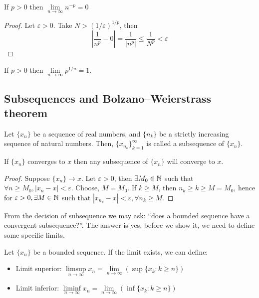 \begin{theorem}
    If $p>0$ then $\lim \limits_{n \to \infty}n^{-p} = 0$
\end{theorem}

\begin{proof}
    Let $\varepsilon > 0$. Take $N > (1/\varepsilon)^{1/p}$, then
    \begin{equation*}
        \left |
        \frac{1}{n^p} - 0
        \right | = 
        \frac{1}{|n^p|} \leq
        \frac{1}{N^p} <
        \varepsilon
    \end{equation*}
\end{proof}

\begin{theorem}
    If $p>0$ then $\lim \limits_{n \to \infty} p^{1/n}=1$.
\end{theorem}

\subsection{Subsequences and Bolzano–Weierstrass theorem}

\begin{definition}[Subsequence]
    Let $\{x_n\}$ be a sequence of real numbers, and $\{n_k\}$ be a strictly increasing sequence of natural numbers. Then, $\{x_{n_k}\}_{k=1}^\infty$ is called a subsequence of $\{x_n\}$.
\end{definition}

\begin{theorem}
    If $\{x_n\}$ converges to $x$ then any subsequence of $\{x_n\}$ will converge to $x$.
\end{theorem}

\begin{proof}
    Suppose $\{x_n\} \to x$. Let $\varepsilon > 0$, then $\exists M_0 \in \mathbb{N}$ such that $\forall n \geq M_0, |x_n-x| < \varepsilon$. Choose, $M=M_0$. If $k \geq M$, then $n_k \geq k \geq M = M_0$, hence for $\varepsilon>0, \exists M \in \mathbb{N}$ such that $|x_{n_k}-x| < \varepsilon, \forall n_k \geq M$.
\end{proof}

From the decision of subsequence we may ask: ``does a bounded sequence have a convergent subsequence?''. The answer is yes, before we show it, we need to define some specific limits.

\begin{definition}
    Let $\{x_n\}$ be a bounded sequence. If the limit exists, we can define:
    \begin{itemize}
        \item Limit superior: $\limsup \limits_{n \to \infty} x_n = \lim \limits_{n \to \infty} \left( \sup \{ x_k: k \geq n\}\right)$
        \item Limit inferior: $\liminf \limits_{n \to \infty} x_n = \lim \limits_{n \to \infty} \left( \inf \{ x_k: k \geq n\}\right)$
    \end{itemize}
\end{definition}

